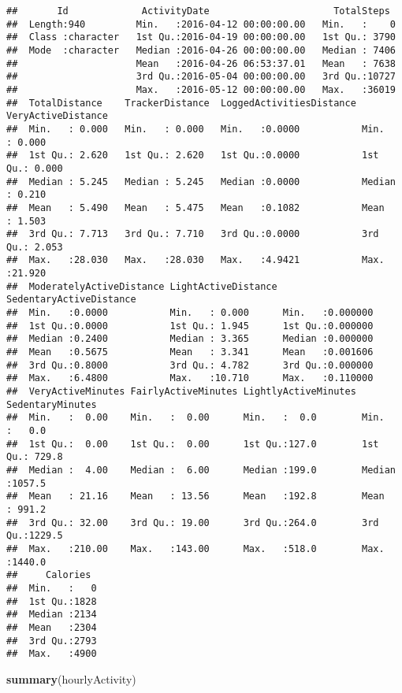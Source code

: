 \documentclass[
]{article}
\newenvironment{Shaded}{\begin{snugshade}}{\end{snugshade}}
\newcommand{\FunctionTok}[1]{\textcolor[rgb]{0.13,0.29,0.53}{\textbf{#1}}}
\newcommand{\NormalTok}[1]{#1}
\begin{document}
\begin{verbatim}
##       Id             ActivityDate                      TotalSteps   
##  Length:940         Min.   :2016-04-12 00:00:00.00   Min.   :    0  
##  Class :character   1st Qu.:2016-04-19 00:00:00.00   1st Qu.: 3790  
##  Mode  :character   Median :2016-04-26 00:00:00.00   Median : 7406  
##                     Mean   :2016-04-26 06:53:37.01   Mean   : 7638  
##                     3rd Qu.:2016-05-04 00:00:00.00   3rd Qu.:10727  
##                     Max.   :2016-05-12 00:00:00.00   Max.   :36019  
##  TotalDistance    TrackerDistance  LoggedActivitiesDistance VeryActiveDistance
##  Min.   : 0.000   Min.   : 0.000   Min.   :0.0000           Min.   : 0.000    
##  1st Qu.: 2.620   1st Qu.: 2.620   1st Qu.:0.0000           1st Qu.: 0.000    
##  Median : 5.245   Median : 5.245   Median :0.0000           Median : 0.210    
##  Mean   : 5.490   Mean   : 5.475   Mean   :0.1082           Mean   : 1.503    
##  3rd Qu.: 7.713   3rd Qu.: 7.710   3rd Qu.:0.0000           3rd Qu.: 2.053    
##  Max.   :28.030   Max.   :28.030   Max.   :4.9421           Max.   :21.920    
##  ModeratelyActiveDistance LightActiveDistance SedentaryActiveDistance
##  Min.   :0.0000           Min.   : 0.000      Min.   :0.000000       
##  1st Qu.:0.0000           1st Qu.: 1.945      1st Qu.:0.000000       
##  Median :0.2400           Median : 3.365      Median :0.000000       
##  Mean   :0.5675           Mean   : 3.341      Mean   :0.001606       
##  3rd Qu.:0.8000           3rd Qu.: 4.782      3rd Qu.:0.000000       
##  Max.   :6.4800           Max.   :10.710      Max.   :0.110000       
##  VeryActiveMinutes FairlyActiveMinutes LightlyActiveMinutes SedentaryMinutes
##  Min.   :  0.00    Min.   :  0.00      Min.   :  0.0        Min.   :   0.0  
##  1st Qu.:  0.00    1st Qu.:  0.00      1st Qu.:127.0        1st Qu.: 729.8  
##  Median :  4.00    Median :  6.00      Median :199.0        Median :1057.5  
##  Mean   : 21.16    Mean   : 13.56      Mean   :192.8        Mean   : 991.2  
##  3rd Qu.: 32.00    3rd Qu.: 19.00      3rd Qu.:264.0        3rd Qu.:1229.5  
##  Max.   :210.00    Max.   :143.00      Max.   :518.0        Max.   :1440.0  
##     Calories   
##  Min.   :   0  
##  1st Qu.:1828  
##  Median :2134  
##  Mean   :2304  
##  3rd Qu.:2793  
##  Max.   :4900
\end{verbatim}

\begin{Shaded}
\begin{Highlighting}[]
\FunctionTok{summary}\NormalTok{(hourlyActivity)}
\end{Highlighting}
\end{Shaded}
\end{document}
